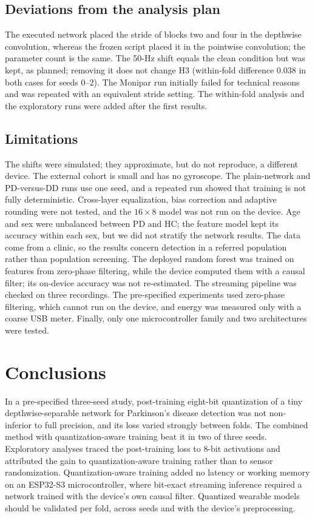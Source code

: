 \documentclass[preprint,12pt]{elsarticle}
\begin{document}
\subsection{Deviations from the analysis plan}
\label{sec:dev}
The executed network placed the stride of blocks two and four in the depthwise convolution, whereas the frozen script placed it in the pointwise convolution; the parameter count is the same. The 50-Hz shift equals the clean condition but was kept, as planned; removing it does not change H3 (within-fold difference 0.038 in both cases for seeds 0--2). The Monipar run initially failed for technical reasons and was repeated with an equivalent stride setting. The within-fold analysis and the exploratory runs were added after the first results.

\subsection{Limitations}
The shifts were simulated; they approximate, but do not reproduce, a different device. The external cohort is small and has no gyroscope. The plain-network and PD-versus-DD runs use one seed, and a repeated run showed that training is not fully deterministic. Cross-layer equalization, bias correction and adaptive rounding were not tested, and the $16\times8$ model was not run on the device. Age and sex were unbalanced between PD and HC; the feature model kept its accuracy within each sex, but we did not stratify the network results. The data come from a clinic, so the results concern detection in a referred population rather than population screening. The deployed random forest was trained on features from zero-phase filtering, while the device computed them with a causal filter; its on-device accuracy was not re-estimated. The streaming pipeline was checked on three recordings. The pre-specified experiments used zero-phase filtering, which cannot run on the device, and energy was measured only with a coarse USB meter. Finally, only one microcontroller family and two architectures were tested.

\section{Conclusions}
\label{sec:conclusion}
In a pre-specified three-seed study, post-training eight-bit quantization of a tiny depthwise-separable network for Parkinson's disease detection was not non-inferior to full precision, and its loss varied strongly between folds. The combined method with quantization-aware training beat it in two of three seeds. Exploratory analyses traced the post-training loss to 8-bit activations and attributed the gain to quantization-aware training rather than to sensor randomization. Quantization-aware training added no latency or working memory on an ESP32-S3 microcontroller, where bit-exact streaming inference required a network trained with the device's own causal filter. Quantized wearable models should be validated per fold, across seeds and with the device's preprocessing.
\end{document}
